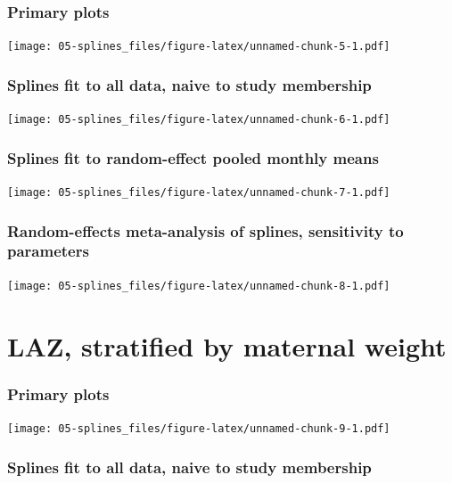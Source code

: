 \documentclass[9pt,]{book}
\begin{document}
\subsubsection{Primary plots}\label{primary-plots-1}

\texttt{[image: 05-splines\_files/figure-latex/unnamed-chunk-5-1.pdf]}

\subsubsection{Splines fit to all data, naive to study
membership}\label{splines-fit-to-all-data-naive-to-study-membership-1}

\texttt{[image: 05-splines\_files/figure-latex/unnamed-chunk-6-1.pdf]}

\subsubsection{Splines fit to random-effect pooled monthly
means}\label{splines-fit-to-random-effect-pooled-monthly-means-1}

\texttt{[image: 05-splines\_files/figure-latex/unnamed-chunk-7-1.pdf]}

\subsubsection{Random-effects meta-analysis of splines, sensitivity to
parameters}\label{random-effects-meta-analysis-of-splines-sensitivity-to-parameters-1}

\texttt{[image: 05-splines\_files/figure-latex/unnamed-chunk-8-1.pdf]}

\section{LAZ, stratified by maternal
weight}\label{laz-stratified-by-maternal-weight}

\subsubsection{Primary plots}\label{primary-plots-2}

\texttt{[image: 05-splines\_files/figure-latex/unnamed-chunk-9-1.pdf]}

\subsubsection{Splines fit to all data, naive to study
membership}\label{splines-fit-to-all-data-naive-to-study-membership-2}
\end{document}
